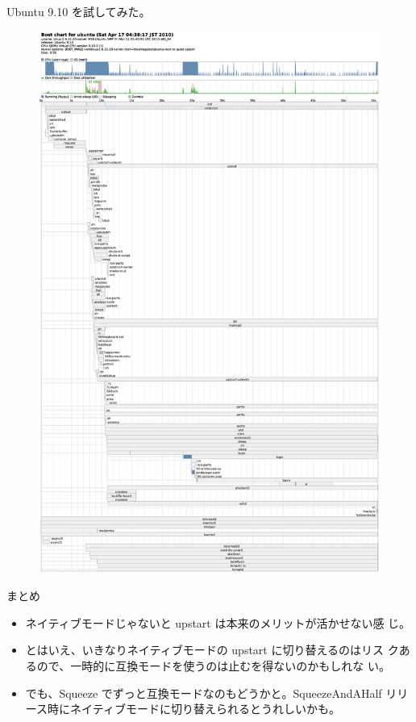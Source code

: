 \begin{frame}{Ubuntu 9.10 を試してみた。}
\begin{minipage}[t]{0.48\hsize}
\begin{figure}[h]
\begin{center}
\includegraphics[width=1.0\hsize]{image201004/upstart/ubuntu-karmic-20100417-3.eps}
\end{center}
\end{figure}
\end{minipage}
\end{frame}

\begin{frame}{まとめ}
\begin{itemize}
 \item ネイティブモードじゃないと upstart は本来のメリットが活かせない感
       じ。
 \item とはいえ、いきなりネイティブモードの upstart に切り替えるのはリス
       クあるので、一時的に互換モードを使うのは止むを得ないのかもしれな
       い。
 \item でも、Squeeze でずっと互換モードなのもどうかと。SqueezeAndAHalf
       リリース時にネイティブモードに切り替えられるとうれしいかも。
\end{itemize}

\end{frame}




